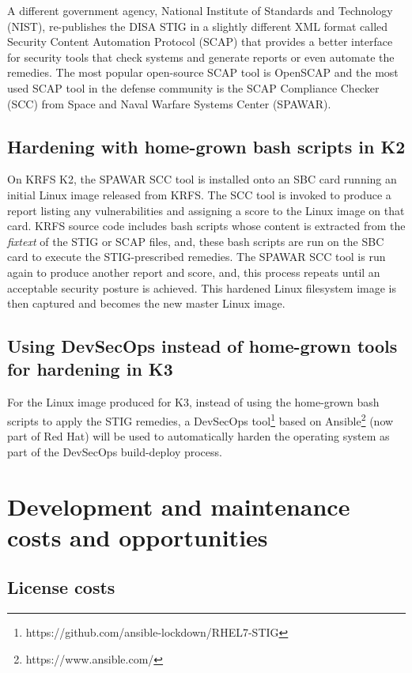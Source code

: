 \documentclass[12pt]{article}
\begin{document}
A different government agency, National Institute of Standards and Technology
(NIST), re-publishes the DISA STIG in a slightly different XML format called
Security Content Automation Protocol (SCAP) that provides a better interface for
security tools that check systems and generate reports or even automate the
remedies.  The most popular open-source SCAP tool is OpenSCAP and the most used
SCAP tool in the defense community is the SCAP Compliance Checker (SCC) from
Space and Naval Warfare Systems Center (SPAWAR).

\subsection{Hardening with home-grown bash scripts in K2}
On KRFS K2, the SPAWAR SCC tool is installed onto an SBC card running an initial
Linux image released from KRFS.  The SCC tool is invoked to produce a report
listing any vulnerabilities and assigning a score to the Linux image on that
card.  KRFS source code includes bash scripts whose content is extracted from
the \emph{fixtext} of the STIG or SCAP files, and, these bash scripts are run on
the SBC card to execute the STIG-prescribed remedies.  The SPAWAR SCC tool is
run again to produce another report and score, and, this process repeats until
an acceptable security posture is achieved.  This hardened Linux filesystem
image is then captured and becomes the new master Linux image.

\subsection{Using DevSecOps instead of home-grown tools for hardening in K3}
For the Linux image produced for K3, instead of using the home-grown bash
scripts to apply the STIG remedies, a DevSecOps
tool\footnote{https://github.com/ansible-lockdown/RHEL7-STIG} based on
Ansible\footnote{https://www.ansible.com/} (now part of Red Hat) will be used to
automatically harden the operating system as part of the DevSecOps build-deploy
process.

%
\newpage
\section{Development and maintenance costs and opportunities}
\label{sec:costs_opportunities}


\subsection{License costs}
\end{document}
